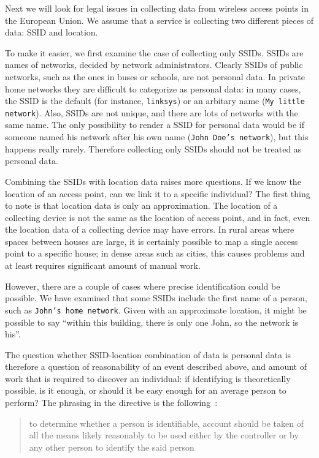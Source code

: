 \documentclass[12pt,a4paper,oneside,pdftex]{report}
\begin{document}
Next we will look for legal issues in collecting data from wireless access points in the European Union. We assume that a service is collecting two different pieces of data: SSID and location.

To make it easier, we first examine the case of collecting only SSIDs. SSIDs are names of networks, decided by network administrators. Clearly SSIDs of public networks, such as the ones in buses or schools, are not personal data. In private home networks they are difficult to categorize as personal data: in many cases, the SSID is the default (for instance, \texttt{linksys}) or an arbitary name (\texttt{My little network}). Also, SSIDs are not unique, and there are lots of networks with the same name. The only possibility to render a SSID for personal data would be if someone named his network after his own name (\texttt{John Doe's network}), but this happens really rarely. Therefore collecting only SSIDs should not be treated as personal data.

Combining the SSIDs with location data raises more questions. If we know the location of an access point, can we link it to a specific individual? The first thing to note is that location data is only an approximation. The location of a collecting device is not the same as the location of access point, and in fact, even the location data of a collecting device may have errors. In rural areas where spaces between houses are large, it is certainly possible to map a single access point to a specific house; in dense areas such as cities, this causes problems and at least requires significant amount of manual work.

However, there are a couple of cases where precise identification could be possible. We have examined that some SSIDs include the first name of a person, such as \texttt{John's home network}. Given with an approximate location, it might be possible to say ``within this building, there is only one John, so the network is his''. 

The question whether SSID-location combination of data is personal data is therefore a question of reasonability of an event described above, and amount of work that is required to discover an individual: if identifying is theoretically possible, is it enough, or should it be easy enough for an average person to perform? The phrasing in the directive is the following~\cite{data_protection}:

\begin{quote}
    to determine whether a person is identifiable, account should be taken of all the means likely reasonably to be used either by the controller or by any other person to identify the said person
\end{quote}
\end{document}
